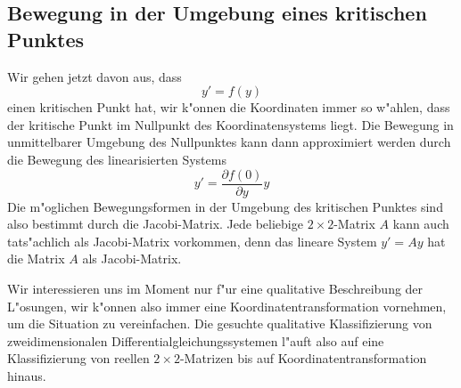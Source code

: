 \subsection{Bewegung in der Umgebung eines kritischen Punktes
\label{geometrie:umgebung-kritisch}}
Wir gehen jetzt davon aus, dass 
\[
y'=f(y)
\]
einen kritischen Punkt hat, wir k"onnen die Koordinaten immer so w"ahlen,
dass der kritische Punkt im Nullpunkt des Koordinatensystems liegt.
Die Bewegung in unmittelbarer Umgebung des Nullpunktes kann dann approximiert
werden durch die Bewegung des linearisierten Systems
\[
y'=\frac{\partial f(0)}{\partial y}y
\]
Die m"oglichen Bewegungsformen in der Umgebung des kritischen Punktes
sind also bestimmt durch die Jacobi-Matrix.
Jede beliebige $2\times 2$-Matrix $A$ kann auch tats"achlich als Jacobi-Matrix
vorkommen, denn das lineare System
$
y'=Ay
$
hat die Matrix $A$ als Jacobi-Matrix.

Wir interessieren uns im Moment nur f"ur eine qualitative Beschreibung
der L"osungen, wir k"onnen also immer eine Koordinatentransformation
vornehmen, um die Situation zu vereinfachen.
Die gesuchte qualitative Klassifizierung von zweidimensionalen
Differentialgleichungssystemen l"auft also auf eine Klassifizierung
von reellen $2\times 2$-Matrizen bis auf Koordinatentransformation
hinaus.

